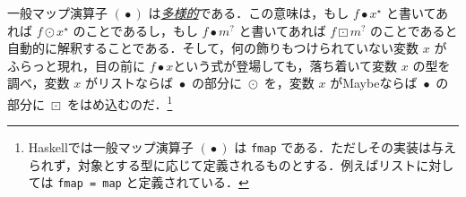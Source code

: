 \documentclass[a4paper]{jsbook}
\def\[{\left[\!\left[}
\def\]{\right]\!\right]}
\newcommand{\programminglanguage}[1]{\textsf{#1}}
\newcommand{\haskell}{\programminglanguage{Haskell}}
\newcommand{\keyword}[1]{{\underline{\emph{#1}}}}
\newcommand{\code}[1]{\texttt{#1}}
\newcommand{\mType}[1]{\mathbf{#1}}
\newcommand{\mListType}[1]{[\mType{#1}]}
\newcommand{\mFunctor}[1]{\textit{\textbf{#1}}}
\newcommand{\mTypeConstructor}[1]{\mathit{#1}} %
\newcommand{\mSpecialTypeClass}[1]{\mathfrak{#1}} %
\newcommand{\mFunctorTypeClass}{\mSpecialTypeClass{Functor}}
\newcommand{\mListWith}[1]{\left[#1\right]}
\newcommand{\mTupleWith}[1]{\left(#1\right)}
\newcommand{\mPureWith}[1]{\langle#1\rangle}
\newcommand{\mList}[1]{{#1}^\mathrm{\star}}
\newcommand{\mMaybe}[1]{{#1}^\text{?}}
\DeclareMathOperator{\mMap}{\bullet}
\DeclareMathOperator{\mMapList}{\odot}
\DeclareMathOperator{\mMapMaybe}{\boxdot}
\DeclareMathOperator{\mListTypeConstructor}{\mTypeConstructor{List}}
\DeclareMathOperator{\mMaybeTypeConstructor}{\mTypeConstructor{Maybe}}
\DeclareMathOperator{\mListFunctor}{\mFunctor{List}}
\DeclareMathOperator{\mMaybeFunctor}{\mFunctor{Maybe}}
\newcommand{\mathTypeConstructor}[1]{\mathit{#1}} %
\newcommand{\mathListWith}[1]{\left[#1\right]}
\newcommand{\mathMaybeWith}[1]{\[#1\]}
\newcommand{\mathPureWith}[1]{\left\langle#1\right\rangle}
\DeclareMathOperator{\mathList}{\mathTypeConstructor{List}}
\DeclareMathOperator{\mathMaybe}{\mathTypeConstructor{Maybe}}
\newcommand{\mathGeneralMap}{\mathbin{\cdot}}
\newcommand{\mathMaybeMap}{\mathbin{\boxdot}}
\begin{document}









一般マップ演算子 $(\mMap)$ は\keyword{多様的}である．この意味は，もし $f\mMap\mList{x}$ と書いてあれば $f\mMapList\mList{x}$ のことであるし，もし $f\mMap\mMaybe{m}$ と書いてあれば $f\mMapMaybe\mMaybe{m}$ のことであると自動的に解釈することである．そして，何の飾りもつけられていない変数 $x$ がふらっと現れ，目の前に $f\mMap x$という式が登場しても，落ち着いて変数 $x$ の型を調べ，変数 $x$ がリストならば $\mMap$ の部分に $\mMapList$ を，変数 $x$ がMaybeならば $\mMap$ の部分に $\mMapMaybe$ をはめ込むのだ．\footnote{\haskell では一般マップ演算子 $(\mMap)$ は \code{fmap} である．ただしその実装は与えられず，対象とする型に応じて定義されるものとする．例えばリストに対しては \code{fmap = map} と定義されている．}
\end{document}
